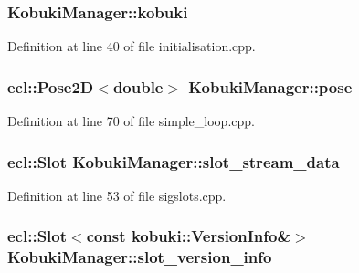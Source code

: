 \subsubsection[{kobuki}]{ {\bf \-Kobuki\-Manager\-::kobuki}\hspace{0.3cm}{\ttfamily  [private]}}\label{classKobukiManager_aedbd8a41454f86c36938b15481688d4c}


\-Definition at line 40 of file initialisation.\-cpp.

\subsubsection[{pose}]{\setlength{\rightskip}{0pt plus 5cm}ecl\-::\-Pose2\-D$<$double$>$ {\bf \-Kobuki\-Manager\-::pose}\hspace{0.3cm}{\ttfamily  [private]}}\label{classKobukiManager_ad0ed629496ed8578df47bd15d4a1b3f6}


\-Definition at line 70 of file simple\-\_\-loop.\-cpp.

\subsubsection[{slot\-\_\-stream\-\_\-data}]{\setlength{\rightskip}{0pt plus 5cm}ecl\-::\-Slot {\bf \-Kobuki\-Manager\-::slot\-\_\-stream\-\_\-data}\hspace{0.3cm}{\ttfamily  [private]}}\label{classKobukiManager_a932be6e61aa406bc1a33c12281bc4499}


\-Definition at line 53 of file sigslots.\-cpp.

\subsubsection[{slot\-\_\-version\-\_\-info}]{\setlength{\rightskip}{0pt plus 5cm}ecl\-::\-Slot$<$const {\bf kobuki\-::\-Version\-Info}\&$>$ {\bf \-Kobuki\-Manager\-::slot\-\_\-version\-\_\-info}\hspace{0.3cm}{\ttfamily  [private]}}\label{classKobukiManager_a3e2ed71aaa1c0bd70840322114076169}


